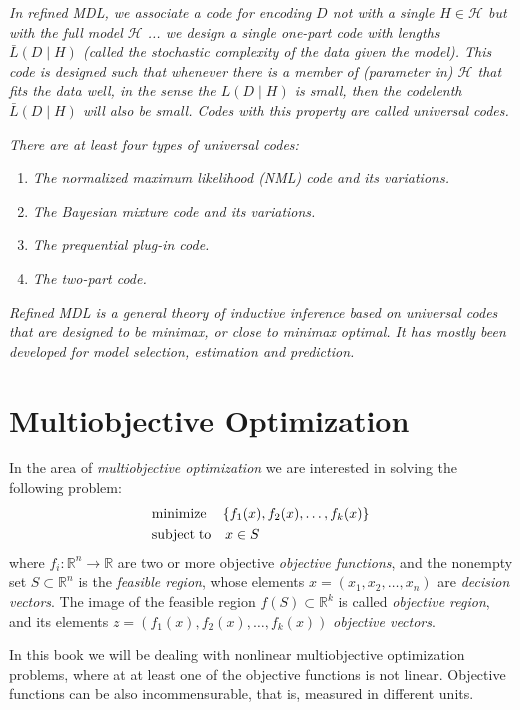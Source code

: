 {\emph{In refined MDL, we associate a code for encoding $D$ not with
    a single $H\in\mathcal{H}$ but with the full model $\mathcal{H}$
    ... we design a single one-part code with lengths $\bar{L}\left(D\mid H\right)$
    (called the stochastic complexity of the data given the model). This
    code is designed such that whenever there is a member of (parameter
    in) $\mathcal{H}$ that fits the data well, in the sense the $L\left(D\mid H\right)$
    is small, then the codelenth $\bar{L}\left(D\mid H\right)$ will also
    be small. Codes with this property are called universal codes.}

\emph{There are at least four types of universal codes:}
\begin{enumerate}
    \item \emph{The normalized maximum likelihood (NML) code and its variations.}
    \item \emph{The Bayesian mixture code and its variations.}
    \item \emph{The prequential plug-in code.}
    \item \emph{The two-part code.}
\end{enumerate}
\emph{Refined MDL is a general theory of inductive inference based
    on universal codes that are designed to be minimax, or close to minimax
    optimal. It has mostly been developed for model selection, estimation
    and prediction.}

\section{Multiobjective Optimization}

In the area of \emph{multiobjective optimization} we are interested in solving the following problem:
\begin{align*}
     & \text{minimize}	   \quad \left\{f_1(x), f_2(x), \ldots, f_k(x) \right\} \\
     & \text{subject\;to} \quad x \in S
\end{align*}
where $f_i:\mathbb{R}^n \rightarrow \mathbb{R}$ are two or more objective \emph{objective functions}, and the nonempty set $S \subset \mathbb{R}^n$ is the \emph{feasible region}, whose elements $x=\left( x_1, x_2, \ldots, x_n \right)$ are \emph{decision vectors}. The image of the feasible region $f(S) \subset \mathbb{R}^k$ is called \emph{objective region}, and its elements $z = \left(f_1(x), f_2(x), \ldots, f_k(x) \right)$ \emph{objective vectors}.

In this book we will be dealing with nonlinear multiobjective optimization problems, where at at least one of the objective functions is not linear. Objective functions can be also incommensurable, that is, measured in different units.

}
